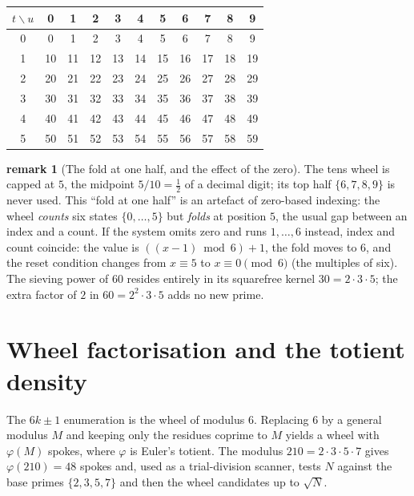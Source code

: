 \documentclass[11pt]{article}
\theoremstyle{definition}
\newtheorem{remark}{remark}
\begin{document}
\begin{center}
\begin{tabular}{c|cccccccccc}
$t\backslash u$ & 0&1&2&3&4&5&6&7&8&9\\
\hline
0 & 0&1&2&3&4&5&6&7&8&9\\
1 & 10&11&12&13&14&15&16&17&18&19\\
2 & 20&21&22&23&24&25&26&27&28&29\\
3 & 30&31&32&33&34&35&36&37&38&39\\
4 & 40&41&42&43&44&45&46&47&48&49\\
5 & 50&51&52&53&54&55&56&57&58&59\\
\end{tabular}
\end{center}

\begin{remark}[The fold at one half, and the effect of the zero]
The tens wheel is capped at $5$, the midpoint $5/10=\tfrac12$ of a decimal
digit; its top half $\{6,7,8,9\}$ is never used. This ``fold at one half'' is an
artefact of zero-based indexing: the wheel \emph{counts} six states $\{0,\dots,5\}$
but \emph{folds} at position $5$, the usual gap between an index and a count.
If the system omits zero and runs $1,\dots,6$ instead, index and count coincide:
the value is $((x-1)\bmod 6)+1$, the fold moves to $6$, and the reset condition
changes from $x\equiv 5$ to $x\equiv 0 \pmod 6$ (the multiples of six). The
sieving power of $60$ resides entirely in its squarefree kernel
$30 = 2\cdot 3\cdot 5$; the extra factor of $2$ in $60=2^2\cdot3\cdot5$ adds no
new prime.
\end{remark}

\section{Wheel factorisation and the totient density}

The $6k\pm1$ enumeration is the wheel of modulus $6$. Replacing $6$ by a general
modulus $M$ and keeping only the residues coprime to $M$ yields a wheel with
$\varphi(M)$ spokes, where $\varphi$ is Euler's totient. The modulus $210 =
2\cdot3\cdot5\cdot7$ gives $\varphi(210)=48$ spokes and, used as a trial-division
scanner, tests $N$ against the base primes $\{2,3,5,7\}$ and then the wheel
candidates up to $\sqrt N$.
\end{document}
